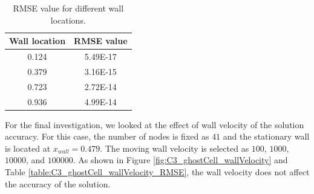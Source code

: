 \begin{table}[H]
\centering
\begin{tabular}{c | c}
	 Wall location & RMSE value \\ \hline \hline
	 0.124 & 5.49E-17 \\ \hline
	 0.379 & 3.16E-15 \\ \hline
	 0.723 & 2.72E-14 \\ \hline
	 0.936 & 4.99E-14
\end{tabular}
\caption{RMSE value for different wall locations.}
\label{table:C3_ghostCell_wallLocation_RMSE}
\end{table}

For the final investigation, we looked at the effect of wall velocity of the solution accuracy. For this case, the number of nodes is fixed as $41$ and the stationary wall is located at $x_{wall} = 0.479$. The moving wall velocity is selected as $100$, $1000$, $10000$, and $100000$. As shown in Figure \ref{fig:C3_ghostCell_wallVelocity} and Table \ref{table:C3_ghostCell_wallVelocity_RMSE}, the wall velocity does not affect the accuracy of the solution.

